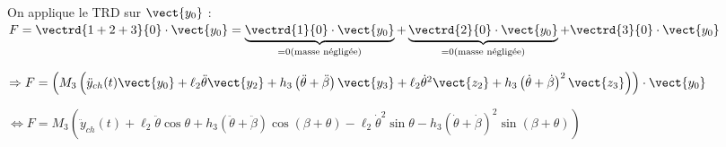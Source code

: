 \documentclass[10pt,fleqn]{article} %
\begin{document}
\begin{corrige}
On applique le TRD sur $\vect{y_0}$ :
$F = \vectrd{1+2+3}{0}\cdot \vect{y_0}= \underbrace{\vectrd{1}{0} \cdot  \vect{y_0}}_{=0 \text{(masse négligée)}}+ \underbrace{\vectrd{2}{0}\cdot  \vect{y_0}}_{=0 \text{(masse négligée)}} + \vectrd{3}{0}\cdot \vect{y_0}$

 $ \Rightarrow F = \left( M_3\left(\ddot{y}_{ch}(t) \vect{y_0}+\ell_2\ddot{\theta} \vect{y_2}+h_3\left(\ddot{\theta}+\ddot{\beta}\right) \vect{y_3}
+   
\ell_2\dot{\theta}^2 \vect{z_2}  +h_3\left(\dot{\theta}+\dot{\beta}\right)^2\vect{z_3}\right)\right) \cdot \vect{y_0}$

 $ \Leftrightarrow F =  M_3\left(\ddot{y}_{ch}(t) +\ell_2\ddot{\theta} \cos \theta +h_3\left(\ddot{\theta}+\ddot{\beta}\right) \cos \left( \beta+\theta\right)
-
\ell_2\dot{\theta}^2 \sin \theta   -h_3\left(\dot{\theta}+\dot{\beta}\right)^2  \sin \left( \beta+\theta\right)\right) $
\end{corrige}
\else
\fi


%
%
%
%
%
%
%
%
%
\end{document}
